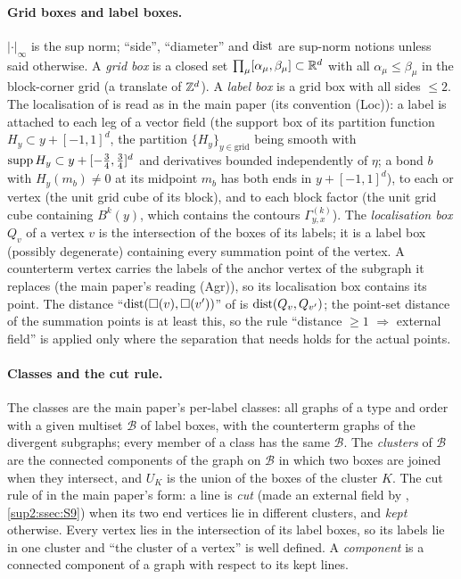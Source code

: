\paragraph{Grid boxes and label boxes.} $|\cdot|_\infty$ is the sup norm; ``side'', ``diameter'' and $\operatorname{dist}$ are sup-norm notions unless said otherwise. A \emph{grid box} is a closed set $\prod_\mu[\alpha_\mu,\beta_\mu]\subset\mathbb R^d$ with all $\alpha_\mu\le\beta_\mu$ in the block-corner grid (a translate of $\mathbb Z^d$). A \emph{label box} is a grid box with all sides $\le2$. The localisation of \cite[p.~420]{Ba3} is read as in the main paper (its convention (Loc)): a label is attached to each leg of a vector field (the support box of its partition function $H_y\subset y+[-1,1]^d$, the partition $\{H_y\}_{y\in\text{grid}}$ being smooth with $\operatorname{supp} H_y\subset y+[-\frac34,\frac34]^d$ and derivatives bounded independently of $\eta$; a bond $b$ with $H_y(m_b)\ne0$ at its midpoint $m_b$ has both ends in $y+[-1,1]^d$), to each \cite[(1.6)]{Ba3} or \cite[(1.7)]{Ba3} vertex (the unit grid cube of its block), and to each block factor \cite[(1.12)--(1.15)]{Ba3} (the unit grid cube containing $B^k(y)$, which contains the contours $\Gamma^{(k)}_{y,x}$). The \emph{localisation box} $Q_v$ of a vertex $v$ is the intersection of the boxes of its labels; it is a label box (possibly degenerate) containing every summation point of the vertex. A counterterm vertex carries the labels of the anchor vertex of the subgraph it replaces (the main paper's reading (Agr)), so its localisation box contains its point. The distance ``$\operatorname{dist}(\square(v),\square(v'))$'' of \cite[pp.~432--433]{Ba3} is $\operatorname{dist}(Q_v,Q_{v'})$; the point-set distance of the summation points is at least this, so the rule ``distance $\ge1$ $\Rightarrow$ external field'' is applied only where the separation that \cite[(3.1)]{Ba3} needs holds for the actual points.

\paragraph{Classes and the cut rule.} The classes are the main paper's per-label classes: all graphs of a type and order with a given multiset $\mathcal B$ of label boxes, with the counterterm graphs of the divergent subgraphs; every member of a class has the same $\mathcal B$. The \emph{clusters} of $\mathcal B$ are the connected components of the graph on $\mathcal B$ in which two boxes are joined when they intersect, and $U_K$ is the union of the boxes of the cluster $K$. The cut rule of \cite[p.~432]{Ba3} in the main paper's form: a line is \emph{cut} (made an external field by \cite[(3.1)]{Ba3}, \cref{sup2:ssec:S9}) when its two end vertices lie in different clusters, and \emph{kept} otherwise. Every vertex lies in the intersection of its label boxes, so its labels lie in one cluster and ``the cluster of a vertex'' is well defined. A \emph{component} is a connected component of a graph with respect to its kept lines.

